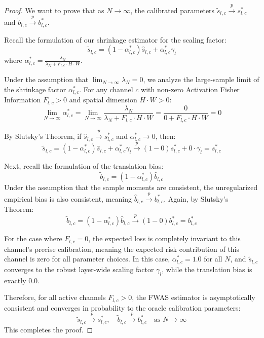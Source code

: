\documentclass{article}
\theoremstyle{plain}
\theoremstyle{definition}
\theoremstyle{remark}
\begin{document}
\begin{proof}
We want to prove that as $N \to \infty$, the calibrated parameters $\tilde{s}_{l,c} \xrightarrow{p} s^*_{l,c}$ and $\tilde{b}_{l,c} \xrightarrow{p} b^*_{l,c}$.

Recall the formulation of our shrinkage estimator for the scaling factor:
\begin{equation}
    \tilde{s}_{l,c} = (1 - \alpha_{l,c}^*)\hat{s}_{l,c} + \alpha_{l,c}^* \gamma_l
\end{equation}
where $\alpha_{l,c}^* = \frac{\lambda_N}{\lambda_N + F_{l,c} \cdot H \cdot W}$.

Under the assumption that $\lim_{N \to \infty} \lambda_N = 0$, we analyze the large-sample limit of the shrinkage factor $\alpha_{l,c}^*$. For any channel $c$ with non-zero Activation Fisher Information $F_{l,c} > 0$ and spatial dimension $H \cdot W > 0$:
\begin{equation}
    \lim_{N \to \infty} \alpha_{l,c}^* = \lim_{N \to \infty} \frac{\lambda_N}{\lambda_N + F_{l,c} \cdot H \cdot W} = \frac{0}{0 + F_{l,c} \cdot H \cdot W} = 0
\end{equation}

By Slutsky's Theorem, if $\hat{s}_{l,c} \xrightarrow{p} s^*_{l,c}$ and $\alpha_{l,c}^* \to 0$, then:
\begin{equation}
    \tilde{s}_{l,c} = (1 - \alpha_{l,c}^*)\hat{s}_{l,c} + \alpha_{l,c}^* \gamma_l \xrightarrow{p} (1 - 0)s^*_{l,c} + 0 \cdot \gamma_l = s^*_{l,c}
\end{equation}

Next, recall the formulation of the translation bias:
\begin{equation}
    \tilde{b}_{l,c} = (1 - \alpha_{l,c}^*)\hat{b}_{l,c}
\end{equation}
Under the assumption that the sample moments are consistent, the unregularized empirical bias is also consistent, meaning $\hat{b}_{l,c} \xrightarrow{p} b^*_{l,c}$. Again, by Slutsky's Theorem:
\begin{equation}
    \tilde{b}_{l,c} = (1 - \alpha_{l,c}^*)\hat{b}_{l,c} \xrightarrow{p} (1 - 0)b^*_{l,c} = b^*_{l,c}
\end{equation}

For the case where $F_{l,c} = 0$, the expected loss is completely invariant to this channel's precise calibration, meaning the expected risk contribution of this channel is zero for all parameter choices. In this case, $\alpha_{l,c}^* = 1.0$ for all $N$, and $\tilde{s}_{l,c}$ converges to the robust layer-wide scaling factor $\gamma_l$, while the translation bias is exactly 0.0.

Therefore, for all active channels $F_{l,c} > 0$, the FWAS estimator is asymptotically consistent and converges in probability to the oracle calibration parameters:
\begin{equation}
    \tilde{s}_{l,c} \xrightarrow{p} s^*_{l,c}, \quad \tilde{b}_{l,c} \xrightarrow{p} b^*_{l,c} \quad \text{as } N \to \infty
\end{equation}
This completes the proof.
\end{proof}
\end{document}
